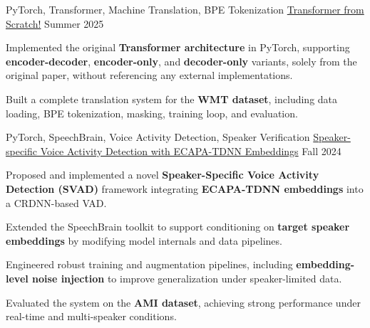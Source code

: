 

\begin{cventries}

\cventry
  {PyTorch, Transformer, Machine Translation, BPE Tokenization} %
  {\href{https://github.com/radinshayanfar/transformer}{Transformer from Scratch!}} %
  {} %
  {Summer 2025} %
  {
    \begin{cvitems}
      \item {Implemented the original \textbf{Transformer architecture} in PyTorch, supporting \textbf{encoder-decoder}, \textbf{encoder-only}, and \textbf{decoder-only} variants, solely from the original paper, without referencing any external implementations.}
      \item {Built a complete translation system for the \textbf{WMT dataset}, including data loading, BPE tokenization, masking, training loop, and evaluation.}
    \end{cvitems}
  }

\cventry
    {PyTorch, SpeechBrain, Voice Activity Detection, Speaker Verification} %
    {\href{https://github.com/radinshayanfar/speechbrain}{Speaker-specific Voice Activity Detection with ECAPA-TDNN Embeddings}} %
    {} %
    {Fall 2024} %
    {
      \begin{cvitems}
        \item {Proposed and implemented a novel \textbf{Speaker-Specific Voice Activity Detection (SVAD)} framework integrating \textbf{ECAPA-TDNN embeddings} into a CRDNN-based VAD.}
        \item {Extended the SpeechBrain toolkit to support conditioning on \textbf{target speaker embeddings} by modifying model internals and data pipelines.}
        \item {Engineered robust training and augmentation pipelines, including \textbf{embedding-level noise injection} to improve generalization under speaker-limited data.}
        \item {Evaluated the system on the \textbf{AMI dataset}, achieving strong performance under real-time and multi-speaker conditions.}
      \end{cvitems}
    }
    

\end{cventries}
